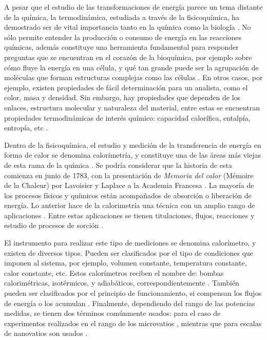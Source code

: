 	A pesar que el estudio de las transformaciones de energía parece un tema distante de la química, la termodinámica, estudiada a través de la fisicoquímica, ha demostrado ser de vital importancia tanto en la química como la biología \cite{atkins2011physical}. No sólo permite entender la producción o consumo de energía en las reacciones químicas, además constituye una herramienta fundamental para responder preguntas que se encuentran en el corazón de la bioquímica, por ejemplo sobre cómo fluye la energía en una célula, y qué tan grande puede ser la agrupación de moléculas que forman estructuras complejas como las células \cite{atkins2011physical}. En otros casos, por ejemplo, existen propiedades de fácil determinación para un analista, como el color, masa y densidad. Sin embargo, hay propiedades que dependen de los enlaces, estructura molecular y naturaleza del material, entre estas se encuentran propiedades termodinámicas de interés químico: capacidad calorífica, entalpía, entropía, etc \cite{gaisford2016principles}.
	
	Dentro de la fisicoquímica, el estudio y medición de la transferencia de energía en forma de calor se denomina calorimetría, y constituye una de las áreas más viejas de esta rama de la química \cite{zielenkiewicz2006theory}. Se podría considerar que la historia de esta comienza en junio de 1783, con la presentación de \textit{Memoria del calor} (Mémoire de la Chaleur) por Lavoisier y Laplace a la Academia Francesa \cite{zielenkiewicz2006theory}. La mayoría de los procesos físicos y químicos están acompañados de absorción o liberación de energía. Lo anterior hace de la calorimetría una técnica con un amplio rango de aplicaciones \cite{wadso2001standards}. Entre estas aplicaciones se tienen titulaciones, flujos, reacciones y estudio de procesos de sorción \cite{gaisford2016principles}.
	
	\newpage
	
	El instrumento para realizar este tipo de mediciones se denomina calorímetro, y existen de diversos tipos. Pueden ser clasificados por el tipo de condiciones que imponen al sistema, por ejemplo, volumen constante, temperatura constante, calor constante, etc. Estos calorímetros reciben el nombre de: bombas calorimétricas, isotérmicos, y adiabáticos, correspondientemente \cite{gaisford2016principles, wadso2001standards}. También pueden ser clasificados por el principio de funcionamiento, si compensan los flujos de energía o los acumulan \cite{gaisford2016principles}. Finalmente, dependiendo del rango de las potencias medidas, se tienen dos términos comúnmente usados:  para el caso de experimentos realizados en el rango de los microvatios \cite{wadso2001standards, wadso2003new}, mientras que para escalas de nanovatios son usados  \cite{wadso2003new}.
	
